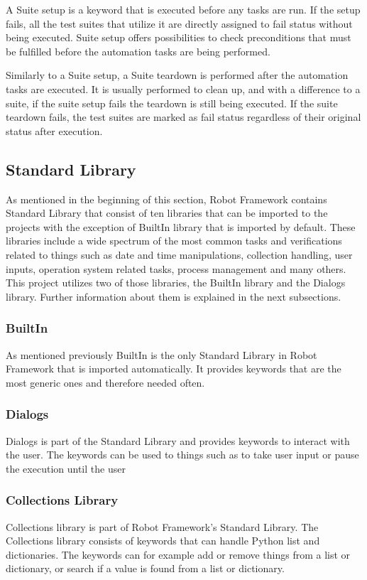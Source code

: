A Suite setup is a keyword that is executed before any tasks are run.
If the setup fails, all the test suites that utilize it are directly assigned to fail status without being executed.
Suite setup offers possibilities to check preconditions that must be fulfilled before the automation tasks are being performed.

Similarly to a Suite setup, a Suite teardown is performed after the automation tasks are executed.
It is usually performed to clean up, and with a difference to a suite, if the suite setup fails the teardown is still being executed.
If the suite teardown fails, the test suites are marked as fail status regardless of their original status after execution.
\cite{robotFrameworkUserGuide:suiteSetupAndTeardown}

\subsection{Standard Library}
As mentioned in the beginning of this section, Robot Framework contains Standard Library that consist of ten libraries that can be imported to the projects with the exception of BuiltIn library that is imported by default.
These libraries include a wide spectrum of the most common tasks and verifications related to things such as date and time manipulations, collection handling, user inputs, operation system related tasks, process management and many others.
This project utilizes two of those libraries, the BuiltIn library and the Dialogs library.
Further information about them is explained in the next subsections.
\cite{robotFramework:standardLibrary}

\subsubsection{BuiltIn}
As mentioned previously BuiltIn is the only Standard Library in Robot Framework that is imported automatically.
It provides keywords that are the most generic ones and therefore needed often.
\cite{robotFramework:builtinLibrary}
\subsubsection{Dialogs}
Dialogs is part of the Standard Library and provides keywords to interact with the user. The keywords can be used to things such as to take user input or pause the execution until the user 
\cite{robotFramework:dialogsLibrary}

\subsubsection{Collections Library}
Collections library is part of Robot Framework's Standard Library.
The Collections library consists of keywords that can handle Python list and dictionaries.
The keywords can for example add or remove things from a list or dictionary, or search if a value is found from a list or dictionary.

